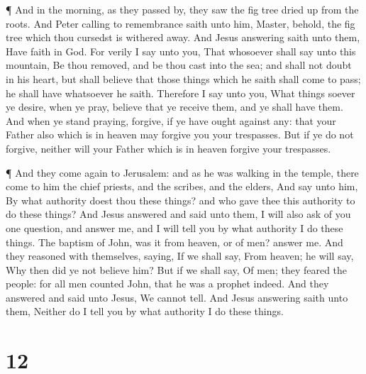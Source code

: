  ¶ And in the morning, as they passed by, they saw the fig
tree dried up from the roots.  And Peter calling to
remembrance saith unto him, Master, behold, the fig tree which thou
cursedst is withered away.  And Jesus answering saith unto
them, Have faith in God.  For verily I say unto you, That
whosoever shall say unto this mountain, Be thou removed, and be thou
cast into the sea; and shall not doubt in his heart, but shall believe
that those things which he saith shall come to pass; he shall have
whatsoever he saith.  Therefore I say unto you, What things
soever ye desire, when ye pray, believe that ye receive them, and ye
shall have them.  And when ye stand praying, forgive, if ye
have ought against any: that your Father also which is in heaven may
forgive you your trespasses.  But if ye do not forgive,
neither will your Father which is in heaven forgive your trespasses.

 ¶ And they come again to Jerusalem: and as he was walking
in the temple, there come to him the chief priests, and the scribes, and
the elders,  And say unto him, By what authority doest thou
these things? and who gave thee this authority to do these things?
 And Jesus answered and said unto them, I will also ask of
you one question, and answer me, and I will tell you by what authority I
do these things.  The baptism of John, was it from heaven,
or of men? answer me.  And they reasoned with themselves,
saying, If we shall say, From heaven; he will say, Why then did ye not
believe him?  But if we shall say, Of men; they feared the
people: for all men counted John, that he was a prophet indeed.
 And they answered and said unto Jesus, We cannot tell. And
Jesus answering saith unto them, Neither do I tell you by what authority
I do these things.

\hypertarget{section-11}{%
\section{12}\label{section-11}}

